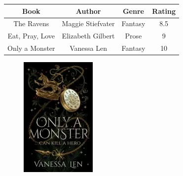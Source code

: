 \documentclass{article}
\begin{document}
\begin{table}[h!]
\centering
\begin{tabular}{|c|c|c|c|}
\hline
Book & Author & Genre & Rating \\
\hline
The Ravens & Maggie Stiefvater & Fantasy & 8.5 \\
\hline
Eat, Pray, Love & Elizabeth Gilbert & Prose & 9 \\
\hline
Only a Monster & Vanessa Len & Fantasy & 10 \\
\hline
\end{tabular}
\end{table}
\begin{figure}[h!]
\centering
\includegraphics{book.png}
\end{figure}
\end{document}
